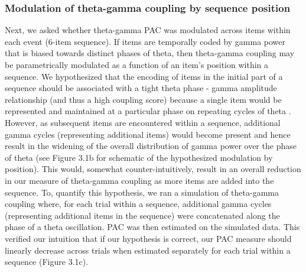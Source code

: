 \subsubsection{Modulation of theta-gamma coupling by sequence
position}\label{modulation-of-theta-gamma-coupling-by-sequence-position}

Next, we asked whether theta-gamma PAC was modulated across items within
each event (6-item sequence). If items are temporally coded by gamma
power that is biased towards distinct phases of theta, then theta-gamma
coupling may be parametrically modulated as a function of an item's
position within a sequence. We hypothesized that the encoding of items
in the initial part of a sequence should be associated with a tight
theta phase - gamma amplitude relationship (and thus a high coupling
score) because a single item would be represented and maintained at a
particular phase on repeating cycles of theta
\autocites{jensen_hippocampal_1996}{jensen_hippocampal_1996}. However,
as subsequent items are encountered within a sequence, additional gamma
cycles (representing additional items) would become present and hence
result in the widening of the overall distribution of gamma power over
the phase of theta (see Figure 3.1b for schematic of the hypothesized
modulation by position). This would, somewhat counter-intuitively,
result in an overall reduction in our measure of theta-gamma coupling as
more items are added into the sequence. To, quantify this hypothesis, we
ran a simulation of theta-gamma coupling where, for each trial within a
sequence, additional gamma cycles (representing additional items in the
sequence) were concatenated along the phase of a theta oscillation. PAC
was then estimated on the simulated data. This verified our intuition
that if our hypothesis is correct, our PAC measure should linearly
decrease across trials when estimated separately for each trial within a
sequence (Figure 3.1c).

